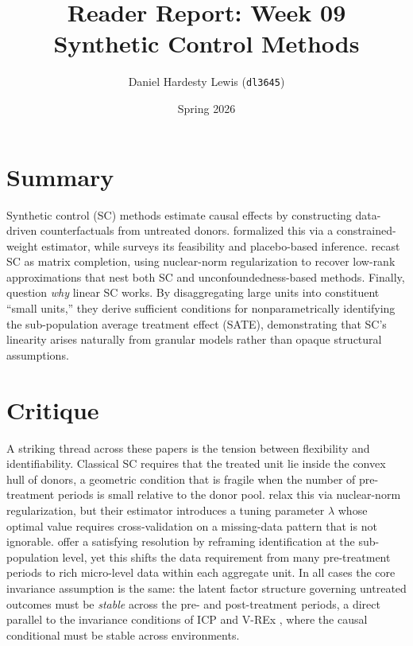 \documentclass[11pt,twoside]{article}
\title{\textbf{Reader Report: Week 09}\\ \large Synthetic Control Methods}
\author{Daniel Hardesty Lewis (\texttt{dl3645})}
\date{Spring 2026}
\begin{document}
\maketitle
\thispagestyle{fancy}

\section*{Summary}
Synthetic control (SC) methods estimate causal effects by constructing data-driven counterfactuals from untreated donors. \citet{abadie2010sc} formalized this via a constrained-weight estimator, while \citet{abadie2021sc} surveys its feasibility and placebo-based inference. \citet{athey2021mc} recast SC as matrix completion, using nuclear-norm regularization to recover low-rank approximations that nest both SC and unconfoundedness-based methods. Finally, \citet{shi2022sc} question \emph{why} linear SC works. By disaggregating large units into constituent ``small units,'' they derive sufficient conditions for nonparametrically identifying the sub-population average treatment effect (SATE), demonstrating that SC's linearity arises naturally from granular models rather than opaque structural assumptions.

\section*{Critique}
A striking thread across these papers is the tension between flexibility and identifiability. Classical SC \citep{abadie2010sc} requires that the treated unit lie inside the convex hull of donors, a geometric condition that is fragile when the number of pre-treatment periods is small relative to the donor pool. \citet{athey2021mc} relax this via nuclear-norm regularization, but their estimator introduces a tuning parameter $\lambda$ whose optimal value requires cross-validation on a missing-data pattern that is not ignorable. \citet{shi2022sc} offer a satisfying resolution by reframing identification at the sub-population level, yet this shifts the data requirement from many pre-treatment periods to rich micro-level data within each aggregate unit. In all cases the core invariance assumption is the same: the latent factor structure governing untreated outcomes must be \emph{stable} across the pre- and post-treatment periods, a direct parallel to the invariance conditions of ICP \citep{peters2016icp} and V-REx \citep{krueger2021rex}, where the causal conditional must be stable across environments.
\end{document}
